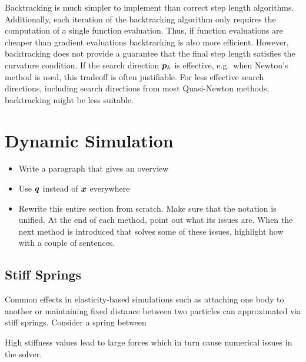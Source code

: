 Backtracking is much simpler to implement than correct step length algorithms. Additionally, each iteration of the backtracking algorithm
only requires the computation of a single function evaluation. Thus, if function evaluations are cheaper than gradient evaluations 
backtracking is also more efficient. However, backtracking does not provide a guarantee that the final step length satisfies the curvature
condition. If the search direction $\bm{p}_k$ is effective, e.g.\ when Newton's method is used, this tradeoff is often justifiable. 
For less effective search directions, including search directions from most Quasi-Newton methods, backtracking might be less suitable.

\section{Dynamic Simulation}\label{s:dynamic-simulation}
\begin{itemize}
    \item Write a paragraph that gives an overview
    \item Use $\bm{q}$ instead of $\bm{x}$ everywhere
    \item Rewrite this entire section from scratch. Make sure that the notation is unified. At the end of each method,
        point out what its issues are. When the next method is introduced that solves some of these issues, highlight
        how with a couple of sentences.
\end{itemize}

\subsection{Stiff Springs}\label{ss:stiff-springs}
Common effects in elasticity-based simulations such as attaching one body to another or maintaining fixed distance between two 
particles can approximated via stiff springs. Consider a spring between 


High stiffness values lead to large forces which in turn cause numerical issues in the solver. 

